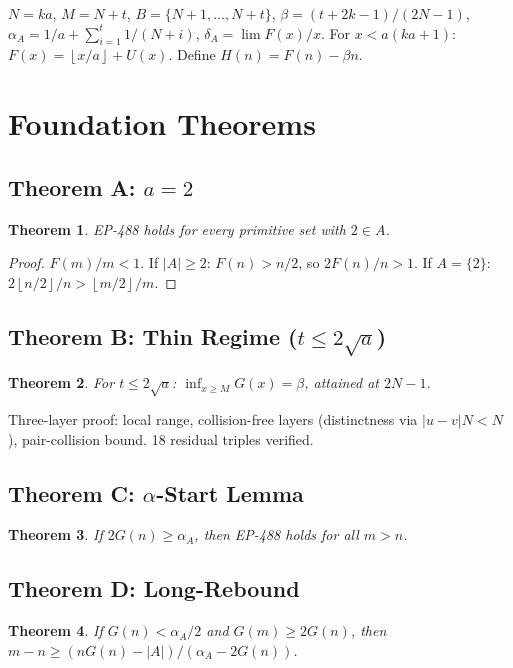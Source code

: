 \documentclass[11pt,a4paper]{article}
\newtheorem{theorem}{Theorem}[section]
\theoremstyle{definition}
\newcommand{\floor}[1]{\left\lfloor #1 \right\rfloor}
\begin{document}
$N = ka$, $M = N+t$, $B = \{N+1,\ldots,N+t\}$, $\beta = (t+2k-1)/(2N-1)$, $\alpha_A = 1/a + \sum_{i=1}^t 1/(N+i)$, $\delta_A = \lim F(x)/x$. For $x < a(ka+1)$: $F(x) = \floor{x/a} + U(x)$. Define $H(n) = F(n) - \beta n$.

\section{Foundation Theorems}

\subsection{Theorem A: $a = 2$}
\begin{theorem}\label{thm:a2} EP-488 holds for every primitive set with $2 \in A$. \end{theorem}
\begin{proof} $F(m)/m < 1$. If $|A| \geq 2$: $F(n) > n/2$, so $2F(n)/n > 1$. If $A = \{2\}$: $2\floor{n/2}/n > \floor{m/2}/m$. \end{proof}

\subsection{Theorem B: Thin Regime ($t \leq 2\sqrt{a}$)}
\begin{theorem}\label{thm:thin} For $t \leq 2\sqrt{a}$: $\inf_{x \geq M} G(x) = \beta$, attained at $2N-1$. \end{theorem}
Three-layer proof: local range, collision-free layers (distinctness via $|u-v|N < N$), pair-collision bound. 18 residual triples verified.

\subsection{Theorem C: $\alpha$-Start Lemma}
\begin{theorem}\label{thm:alpha} If $2G(n) \geq \alpha_A$, then EP-488 holds for all $m > n$. \end{theorem}

\subsection{Theorem D: Long-Rebound}
\begin{theorem}\label{thm:longreb} If $G(n) < \alpha_A/2$ and $G(m) \geq 2G(n)$, then $m - n \geq (nG(n) - |A|)/(\alpha_A - 2G(n))$. \end{theorem}
\end{document}

